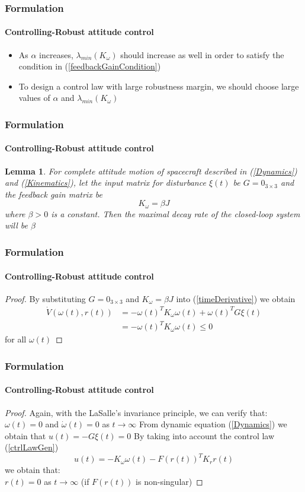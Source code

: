 \documentclass{beamer}
\begin{document}
\begin{frame}
\frametitle{Formulation}
\framesubtitle{Controlling-Robust attitude control}
\begin{itemize}
	\item As $\alpha$ increases, $\lambda_{min}(K_{\omega})$ should increase as well in order to satisfy the condition in (\ref{feedbackGainCondition})
	\item To design a control law with large robustness margin, we should choose large values of $\alpha$ and $\lambda_{min}(K_{\omega})$
\end{itemize}
\end{frame}

\begin{frame}
\frametitle{Formulation}
\framesubtitle{Controlling-Robust attitude control}
\newtheorem{decayWithoutDisturbance}{Lemma}
\begin{decayWithoutDisturbance}
	For complete attitude motion of spacecraft described in (\ref{Dynamics}) and (\ref{Kinematics}), let the input matrix for disturbance $\xi(t)$ be $G=0_{3\times 3}$ and the feedback gain matrix be
	\begin{equation}
	K_{\omega}=\beta J
	\end{equation}
	where $\beta>0$ is a constant. Then the maximal decay rate of the closed-loop system will be $\beta$
\end{decayWithoutDisturbance}
\end{frame}

\begin{frame}
\frametitle{Formulation}
\framesubtitle{Controlling-Robust attitude control}
\begin{proof}
	By substituting $G=0_{3\times 3}$ and $K_{\omega}=\beta J$ into (\ref{timeDerivative}) we obtain
	\begin{equation}
	\begin{split}
	\dot{V}(\omega(t),r(t))&=-\omega(t)^{T}K_{\omega}\omega(t)+\omega(t)^{T}G\xi(t)\\
	&=-\omega(t)^{T}K_{\omega}\omega(t)\leq 0
	\end{split}
\end{equation}
for all $\omega(t)$
\end{proof}
\end{frame}

\begin{frame}
\frametitle{Formulation}
\framesubtitle{Controlling-Robust attitude control}
\begin{proof}
	Again, with the LaSalle's invariance principle, we can verify that:
	$\omega(t)=0$ and $\dot{\omega}(t)=0$ as $t \to \infty$
	From dynamic equation (\ref{Dynamics}) we obtain that $u(t)=-G\xi(t)=0$
	By taking into account the control law (\ref{ctrlLawGen})
	$$u(t)=-K_{\omega}\omega(t)-F(r(t))^{T}K_{r}r(t)$$ we obtain that:\\
	$r(t)=0$ as $t\to\infty$ (if $F(r(t))$ is non-singular)
\end{proof}
\end{frame}
\end{document}
